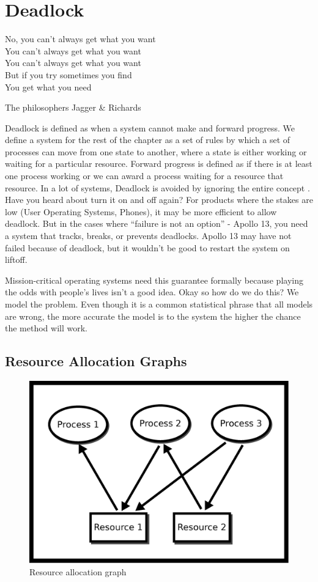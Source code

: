 \chapter{Deadlock}

\epigraph{No, you can't always get what you want
\\You can't always get what you want
\\You can't always get what you want
\\But if you try sometimes you find
\\You get what you need}{The philosophers Jagger \& Richards}

\gls{Deadlock} is defined as when a system cannot make and forward progress.
We define a system for the rest of the chapter as a set of rules by which a set of processes can move from one state to another, where a state is either working or waiting for a particular resource.
Forward progress is defined as if there is at least one process working or we can award a process waiting for a resource that resource.
In a lot of systems, Deadlock is avoided by ignoring the entire concept \cite[P.237]{silberschatz2006operating}.
Have you heard about turn it on and off again?
For products where the stakes are low (User Operating Systems, Phones), it may be more efficient to allow deadlock.
But in the cases where ``failure is not an option'' - Apollo 13, you need a system that tracks, breaks, or prevents deadlocks.
Apollo 13 may have not failed because of deadlock, but it wouldn't be good to restart the system on liftoff.

Mission-critical operating systems need this guarantee formally because playing the odds with people's lives isn't a good idea.
Okay so how do we do this? We model the problem.
Even though it is a common statistical phrase that all models are wrong, the more accurate the model is to the system the higher the chance the method will work.

\section{Resource Allocation Graphs}

\begin{figure}[H]
\centering
\includegraphics[width=.6\textwidth]{deadlock/drawings/rag.eps}
\caption{Resource allocation graph}
\label{ragfigure}
\end{figure}

